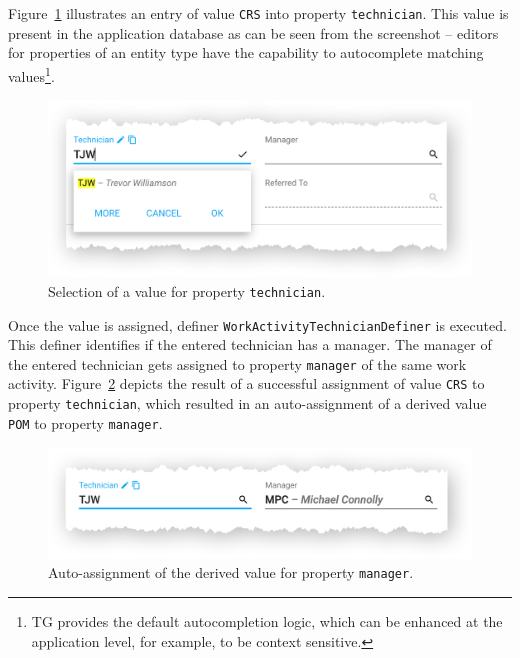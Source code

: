 \documentclass[a4paper,12pt,oneside,openright,final]{memoir} %
\begin{document}
	
	Figure~\ref{fig:tech} illustrates an entry of value \texttt{CRS} into property \texttt{technician}.
	This value is present in the application database as can be seen from the screenshot -- editors for properties of an entity type have the capability to autocomplete matching values\footnote{TG provides the default autocompletion logic, which can be enhanced at the application level, for example, to be context sensitive.}.
	
	\begin{figure}[!h]
  		\centering
      	\includegraphics[width=1.0\textwidth]{images/04-wa-technician-entry.png}  
   	  	\caption{Selection of a value for property \texttt{technician}.}
   		\label{fig:tech}
  	\end{figure}
	
	Once the value is assigned, definer \texttt{WorkActivityTechnicianDefiner} is executed.
	This definer identifies if the entered technician has a manager.
	The manager of the entered technician gets assigned to property \texttt{manager} of the same work activity.
	Figure~\ref{fig:derived-manager} depicts the result of a successful assignment of value \texttt{CRS} to property \texttt{technician}, which resulted in an auto-assignment of a derived value \texttt{POM} to property \texttt{manager}.  

	\begin{figure}[!h]
  		\centering
      	\includegraphics[width=1.0\textwidth]{images/05-wa-technician-entered.png}  
   	  	\caption{Auto-assignment of the derived value for property \texttt{manager}.}
   		\label{fig:derived-manager}
  	\end{figure}
	
\end{document}

